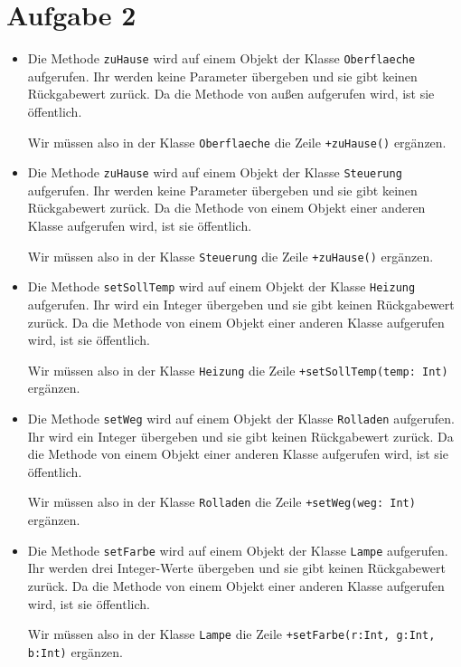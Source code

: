 \documentclass[a4paper]{scrartcl}
\begin{document}
\section*{Aufgabe 2}

\begin{itemize}

\item Die Methode \texttt{zuHause} wird auf einem Objekt der Klasse \texttt{Oberflaeche} aufgerufen. Ihr werden keine Parameter übergeben und sie gibt keinen Rückgabewert zurück. Da die Methode von außen aufgerufen wird, ist sie öffentlich.

Wir müssen also in der Klasse \texttt{Oberflaeche} die Zeile \texttt{+zuHause()} ergänzen.

\item Die Methode \texttt{zuHause} wird auf einem Objekt der Klasse \texttt{Steuerung} aufgerufen. Ihr werden keine Parameter übergeben und sie gibt keinen Rückgabewert zurück. Da die Methode von einem Objekt einer anderen Klasse aufgerufen wird, ist sie öffentlich.

Wir müssen also in der Klasse \texttt{Steuerung} die Zeile \texttt{+zuHause()} ergänzen.

\item Die Methode \texttt{setSollTemp} wird auf einem Objekt der Klasse \texttt{Heizung} aufgerufen. Ihr wird ein Integer übergeben und sie gibt keinen Rückgabewert zurück. Da die Methode von einem Objekt einer anderen Klasse aufgerufen wird, ist sie öffentlich.

Wir müssen also in der Klasse \texttt{Heizung} die Zeile \texttt{+setSollTemp(temp: Int)} ergänzen.

\item Die Methode \texttt{setWeg} wird auf einem Objekt der Klasse \texttt{Rolladen} aufgerufen. Ihr wird ein Integer übergeben und sie gibt keinen Rückgabewert zurück. Da die Methode von einem Objekt einer anderen Klasse aufgerufen wird, ist sie öffentlich.

Wir müssen also in der Klasse \texttt{Rolladen} die Zeile \texttt{+setWeg(weg: Int)} ergänzen.

\item Die Methode \texttt{setFarbe} wird auf einem Objekt der Klasse \texttt{Lampe} aufgerufen. Ihr werden drei Integer-Werte übergeben und sie gibt keinen Rückgabewert zurück. Da die Methode von einem Objekt einer anderen Klasse aufgerufen wird, ist sie öffentlich.

Wir müssen also in der Klasse \texttt{Lampe} die Zeile \texttt{+setFarbe(r:Int, g:Int, b:Int)} ergänzen.


\end{itemize}
\end{document}
